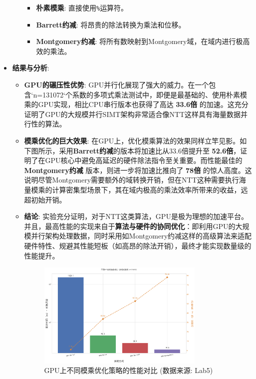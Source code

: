 \documentclass[a4paper]{article}
\begin{document}
\begin{itemize}
\begin{enumerate}
        \begin{itemize}
            \item \textbf{朴素模乘}: 直接使用\texttt{\%}运算符。
            \item \textbf{Barrett约减}: 将昂贵的除法转换为乘法和位移。
            \item \textbf{Montgomery约减}: 将所有数映射到Montgomery域，在域内进行极高效的乘法。
        \end{itemize}
    \end{enumerate}
    \item \textbf{结果与分析}:
    \begin{itemize}
        \item \textbf{GPU的碾压性优势}: GPU并行化展现了强大的威力。在一个包含`n=131072`个系数的多项式乘法测试中，即便是最基础的、使用朴素模乘的GPU实现，相比CPU串行版本也获得了高达 \textbf{33.6倍} 的加速。这充分证明了GPU的大规模并行SIMT架构非常适合像NTT这样具有海量数据并行性的算法。
        \item \textbf{模乘优化的巨大效果}: 在GPU上，优化模乘算法的效果同样立竿见影。如下图所示，采用\textbf{Barrett约减}的版本将加速比从33.6倍提升至 \textbf{52.6倍}，证明了在GPU核心中避免高延迟的硬件除法指令至关重要。而性能最佳的 \textbf{Montgomery约减} 版本，则进一步将加速比推向了 \textbf{78倍} 的惊人高度。这说明尽管Montgomery需要额外的域转换开销，但在NTT这种需要执行海量模乘的计算密集型场景下，其在域内极高的乘法效率所带来的收益，远超初始开销。
        \item \textbf{结论}: 实验充分证明，对于NTT这类算法，GPU是极为理想的加速平台。并且，最高性能的实现来自于\textbf{算法与硬件的协同优化}：即利用GPU的大规模并行架构处理数据，同时采用如Montgomery约减这样的高级算法来适配硬件特性、规避其性能短板（如高昂的除法开销），最终才能实现数量级的性能提升。
        \begin{figure}[H]
            \centering
            \includegraphics[width=0.8\textwidth]{fig/performance.png}
            \caption{GPU上不同模乘优化策略的性能对比 (数据来源: Lab5)}
            \label{fig:gpu_perf}
        \end{figure}
    \end{itemize}
\end{itemize}
\end{document}
